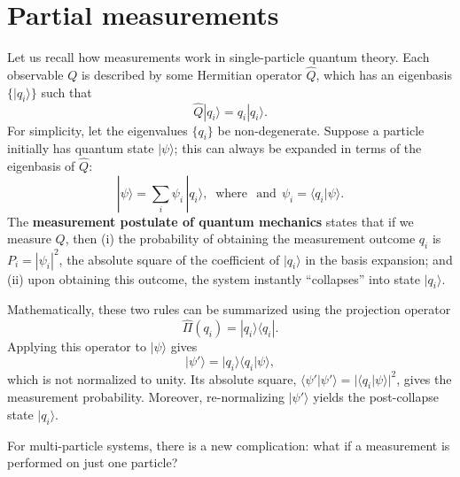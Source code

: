 \documentclass[pra,12pt]{revtex4}
\begin{document}
\section{Partial measurements}
\label{sec:partialmeasurements}

Let us recall how measurements work in single-particle quantum theory.
Each observable $Q$ is described by some Hermitian operator $\hat{Q}$,
which has an eigenbasis $\{|q_i\rangle\}$ such that
\begin{equation}
  \hat{Q}|q_i\rangle = q_i |q_i\rangle.
\end{equation}
For simplicity, let the eigenvalues $\{q_i\}$ be non-degenerate.
Suppose a particle initially has quantum state $|\psi\rangle$; this
can always be expanded in terms of the eigenbasis of $\hat{Q}$:
\begin{equation}
  |\psi\rangle = \sum_i \psi_i\, |q_i\rangle, \;\;\mathrm{where}\;\;\,\textrm{and}\;\, \psi_i = \langle q_i|\psi\rangle.
\end{equation}
The \textbf{measurement postulate of quantum mechanics} states that if
we measure $Q$, then (i) the probability of obtaining the measurement
outcome $q_i$ is $P_i = |\psi_i|^2$, the absolute square of the
coefficient of $|q_i\rangle$ in the basis expansion; and (ii) upon
obtaining this outcome, the system instantly ``collapses'' into state
$|q_i\rangle$.

Mathematically, these two rules can be summarized using the projection
operator
\begin{equation}
  \hat{\Pi}(q_i) = |q_i\rangle\langle q_i|.
\end{equation}
Applying this operator to $|\psi\rangle$ gives
\begin{equation}
  |\psi'\rangle = |q_i\rangle \langle q_i|\psi\rangle,
\end{equation}
which is not normalized to unity.  Its absolute square,
$\langle\psi'|\psi'\rangle = |\langle q_i|\psi\rangle|^2$, gives the
measurement probability.  Moreover, re-normalizing $|\psi'\rangle$
yields the post-collapse state $|q_i\rangle$.

For multi-particle systems, there is a new complication: what if a
measurement is performed on just one particle?
\end{document}
